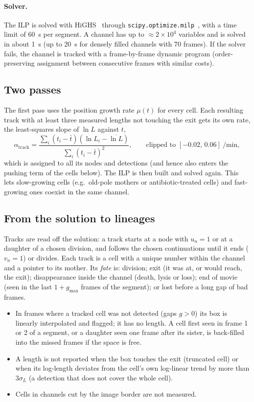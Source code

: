 \documentclass[11pt,a4paper]{article}
\begin{document}
\paragraph{Solver.} The ILP is solved with HiGHS~\cite{huangfu2018} through \texttt{scipy.optimize.milp}~\cite{virtanen2020}, with a time limit of \SI{60}{\second} per segment. A channel has up to $\approx2\times10^4$ variables and is solved in about \SI{1}{\second} (up to \SI{20}{\second} for densely filled channels with 70 frames). If the solver fails, the channel is tracked with a frame-by-frame dynamic program (order-preserving assignment between consecutive frames with similar costs).

\subsection{Two passes}\label{sec:passes}
The first pass uses the position growth rate $\mu(t)$ for every cell. Each resulting track with at least three measured lengths not touching the exit gets its own rate, the least-squares slope of $\ln L$ against $t$,
\begin{equation}
\alpha_{\mathrm{track}}=\frac{\sum_i(t_i-\bar t)(\ln L_i-\overline{\ln L})}{\sum_i(t_i-\bar t)^2},\qquad\text{clipped to }[-0.02,\,0.06]\ \si{\per\minute},
\end{equation}
which is assigned to all its nodes and detections (and hence also enters the pushing term of the cells below). The ILP is then built and solved again. This lets slow-growing cells (e.g.\ old-pole mothers or antibiotic-treated cells) and fast-growing ones coexist in the same channel.

\subsection{From the solution to lineages}\label{sec:outputs}
Tracks are read off the solution: a track starts at a node with $u_n=1$ or at a daughter of a chosen division, and follows the chosen continuations until it ends ($v_n=1$) or divides. Each track is a cell with a unique number within the channel and a pointer to its mother. Its \emph{fate} is: division; exit (it was at, or would reach, the exit); disappearance inside the channel (death, lysis or loss); end of movie (seen in the last $1+g_{\max}$ frames of the segment); or lost before a long gap of bad frames.

\begin{itemize}
\item In frames where a tracked cell was not detected (gaps $g>0$) its box is linearly interpolated and flagged; it has no length. A cell first seen in frame 1 or 2 of a segment, or a daughter seen one frame after its sister, is back-filled into the missed frames if the space is free.
\item A length is not reported when the box touches the exit (truncated cell) or when its log-length deviates from the cell's own log-linear trend by more than $3\sigma_L$ (a detection that does not cover the whole cell).
\item Cells in channels cut by the image border are not measured.
\end{itemize}
\end{document}
